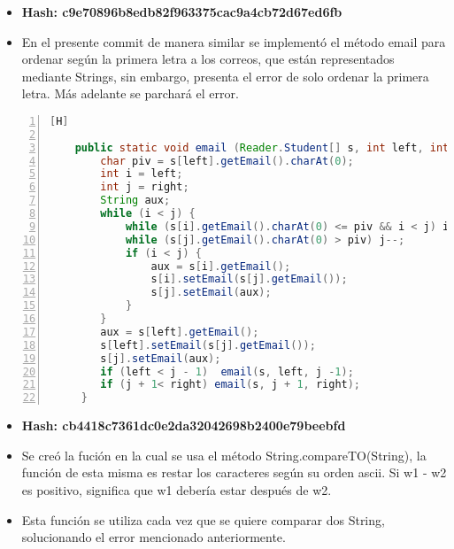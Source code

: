   \begin{itemize}
    \item \textbf{Hash: c9e70896b8edb82f963375cac9a4cb72d67ed6fb}
    \item En el presente commit de manera similar se implementó el método email para ordenar según la primera letra a los correos, que están representados mediante Strings, sin embargo, presenta el error de solo ordenar la primera letra. Más adelante se parchará el error.
  \end{itemize}
  \begin{lstlisting}[language=Java, caption={Commit: Se añadió el método email para ordenar los correos según quicksort}, numbers=left, firstnumber=1][H]

    public static void email (Reader.Student[] s, int left, int right) {
        char piv = s[left].getEmail().charAt(0);
        int i = left;
        int j = right;
        String aux;
        while (i < j) {
            while (s[i].getEmail().charAt(0) <= piv && i < j) i++;
            while (s[j].getEmail().charAt(0) > piv) j--;
            if (i < j) {
                aux = s[i].getEmail();
                s[i].setEmail(s[j].getEmail()); 
                s[j].setEmail(aux);
            }
        }
        aux = s[left].getEmail();
        s[left].setEmail(s[j].getEmail());
        s[j].setEmail(aux);
        if (left < j - 1)  email(s, left, j -1);
        if (j + 1< right) email(s, j + 1, right);
     }

  \end{lstlisting}
  \begin{itemize}
    \item \textbf{Hash: cb4418c7361dc0e2da32042698b2400e79beebfd}
    \item Se creó la fución  en la cual se usa el método String.compareTO(String), la función de esta misma es restar los caracteres según su orden ascii. Si w1 - w2 es positivo, significa que w1 debería estar después de w2.
    \item Esta función se utiliza cada vez que se quiere comparar dos String, solucionando el error mencionado anteriormente. 
  \end{itemize}
